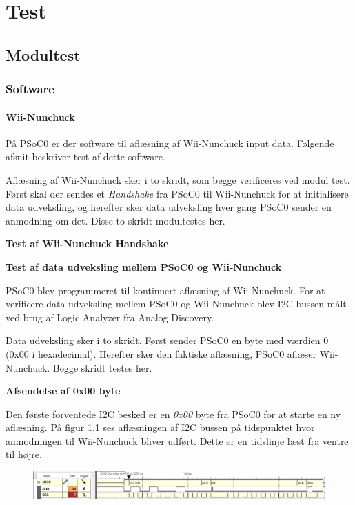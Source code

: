 \chapter{Test}

\section{Modultest}

\subsection{Software}

\subsubsection{Wii-Nunchuck}
På PSoC0 er der software til aflæsning af Wii-Nunchuck input data. Følgende afsnit beskriver test af dette software.

Aflæsning af Wii-Nunchuck sker i to skridt, som begge verificeres ved modul test. Først skal der sendes et \textit{Handshake} fra PSoC0 til Wii-Nunchuck for at initialisere data udveksling, og herefter sker data udveksling hver gang PSoC0 sender en anmodning om det. Disse to skridt modultestes her.

\textbf{Test af Wii-Nunchuck Handshake}

\textbf{Test af data udveksling mellem PSoC0 og Wii-Nunchuck} 

PSoC0 blev programmeret til kontinuert aflæsning af Wii-Nunchuck. For at verificere data udveksling mellem PSoC0 og Wii-Nunchuck blev I2C bussen målt ved brug af Logic Analyzer fra Analog Discovery.

Data udveksling sker i to skridt. Først sender PSoC0 en byte med værdien 0 (0x00 i hexadecimal). Herefter sker den faktiske aflæsning, PSoC0 aflæser Wii-Nunchuck. Begge skridt testes her.

\textbf{Afsendelse af 0x00 byte}

Den første forventede I2C besked er en \textit{0x00} byte fra PSoC0 for at starte en ny aflæsning. På figur \ref{fig:NunchuckWriteValues} ses aflæsningen af I2C bussen på tidspunktet hvor anmodningen til Wii-Nunchuck bliver udført. Dette er en tidslinje læst fra ventre til højre.

\begin{figure}[H]
	\centering
	\includegraphics[width=\textwidth]{Test/images/writerequest}
	\caption{}
	\label{fig:NunchuckWriteValues}
\end{figure}

